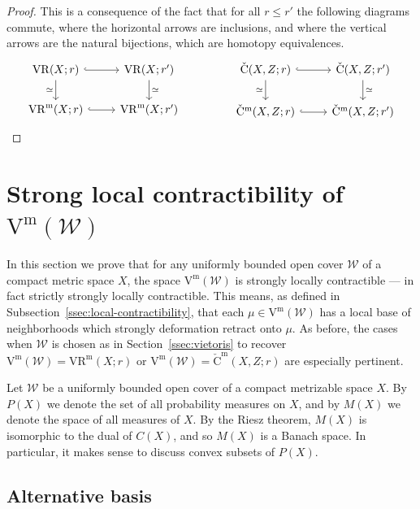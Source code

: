 \documentclass[11pt, reqno, english]{amsart}
\theoremstyle{plain}
\theoremstyle{definition}
\theoremstyle{myremark}
\newcommand{\cW}{\mathcal{W}}
\newcommand{\vr}[2]{\mathrm{VR}(#1;#2)}
\newcommand{\vietm}[1]{\mathrm{V}^\mathrm{m}(#1)}
\newcommand{\vrm}[2]{\mathrm{VR}^\mathrm{m}(#1;#2)}
\newcommand{\acech}[3]{\mathrm{\check{C}}(#1,#2;#3)}
\newcommand{\acechm}[3]{\mathrm{\check{C}}^\mathrm{m}(#1,#2;#3)}
\begin{document}
\begin{proof}
This is a consequence of the fact that for all $r\le r'$ the following diagrams commute, where the horizontal arrows are inclusions, and where the vertical arrows are the natural bijections, which are homotopy equivalences.
\[
\begin{tikzcd}
	{\vr{X}{r}} & {\vr{X}{r'}} \\
	{\vrm{X}{r}} & {\vrm{X}{r'}}
	\arrow[hook, from=1-1, to=1-2]
	\arrow["\simeq"', from=1-1, to=2-1]
	\arrow["\simeq", from=1-2, to=2-2]
	\arrow[hook, from=2-1, to=2-2]
\end{tikzcd}
\hspace{15mm}
\begin{tikzcd}
	{\acech{X}{Z}{r}} & {\acech{X}{Z}{r'}} \\
	{\acechm{X}{Z}{r}} & {\acechm{X}{Z}{r'}}
	\arrow[hook, from=1-1, to=1-2]
	\arrow["\simeq"', from=1-1, to=2-1]
	\arrow["\simeq", from=1-2, to=2-2]
	\arrow[hook, from=2-1, to=2-2]
\end{tikzcd}
\]
\end{proof}




\section{Strong local contractibility of $\vietm{\cW}$}
\label{sec:strong-local-contractibility}

In this section we prove that for any uniformly bounded open cover $\cW$ of a compact metric space $X$, the space $\vietm{\cW}$ is strongly locally contractible --- in fact strictly strongly locally contractible.
This means, as defined in Subsection~\ref{ssec:local-contractibility}, that each $\mu\in \vietm{\cW}$ has a local base of neighborhoods which strongly deformation retract onto $\mu$.
As before, the cases when $\cW$ is chosen as in Section~\ref{ssec:vietoris} to recover $\vietm{\cW}=\vrm{X}{r}$ or $\vietm{\cW}=\acechm{X}{Z}{r}$ are especially pertinent.

Let $\cW$ be a uniformly bounded open cover of a compact metrizable space $X$.
By $P(X)$ we denote the set of all probability measures on $X$, and by $M(X)$ we denote the space of all measures of $X$.
By the Riesz theorem, $M(X)$ is isomorphic to the dual of $C(X)$, and so $M(X)$ is a Banach space.
In particular, it makes sense to discuss convex subsets of $P(X)$.


\subsection{Alternative basis}
\end{document}
